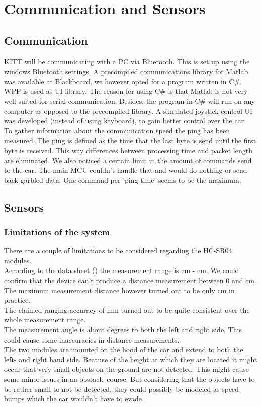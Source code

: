 \documentclass[final]{scrreprt} %
\begin{document}
\chapter{Communication and Sensors}
\section{Communication}
KITT will be communicating with a PC via Bluetooth. 
This is set up using the windows Bluetooth settings.
A precompiled communications library for Matlab was available at Blackboard, we however opted for a program written in C\#.
WPF is used as UI library.
The reason for using C\# is that Matlab is not very well suited for serial communication.
Besides, the program in C\# will run on any computer as opposed to the precompiled library. 
A simulated joystick control UI was developed (instead of using keyboard), to gain better control over the car.
\\
To gather information about the communication speed the ping has been measured. 
The ping is defined as the time that the last byte is send until the first byte is received.
This way differences between processing time and packet length are eliminated.
We also noticed a certain limit in the amount of commands send to the car.
The main MCU couldn't handle that and would do nothing or send back garbled data.
One command per 'ping time' seems to be the maximum.

\section{Sensors}
\subsection{Limitations of the system}

There are a couple of limitations to be considered regarding the HC-SR04 modules.\\
According to the data sheet (\cite{HC-SR04}) the measurement range is \unit[2]{cm} - \unit[400]{cm}. 
We could confirm that the device can't produce a distance measurement between 0 and \unit[2]{cm}. 
The maximum measurement distance however turned out to be only \unit[300]{cm} in practice.\\ 
The claimed ranging accuracy of \unit[3]{mm} turned out to be quite consistent over the whole measurement range.\\
The measurement angle is about \unit[15]{degrees} to both the left and right side. 
This could cause some inaccuracies in distance measurements.\\
The two modules are mounted on the hood of the car and extend to both the left- and right hand side. 
Because of the height at which they are located it might occur that very small objects on the ground are not detected. 
This might cause some minor issues in an obstacle course. 
But considering that the objects have to be rather small to not be detected, they could possibly be modeled as speed bumps which the car wouldn't have to evade.
\end{document}
